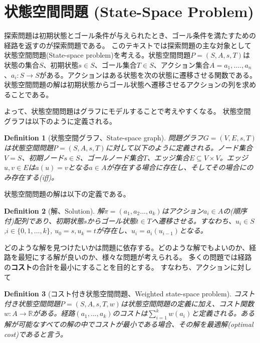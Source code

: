\documentclass{book}
\newtheorem{definition}{Definition}
\begin{document}
\section{状態空間問題 (State-Space Problem)}
\label{sec:state-space-problem}
探索問題は初期状態とゴール条件が与えられたとき、ゴール条件を満たすための経路を返すのが探索問題である。
このテキストでは探索問題の主な対象として状態空間問題(State-space problem)を考える。状態空間問題$P = (S, A, s, T)$は状態の集合$S$、初期状態$s \in S$、ゴール集合$T \in S$、アクション集合$A = {a_1, ....,a_n}$、$a_i : S \rightarrow S$がある。アクションはある状態を次の状態に遷移させる関数である。
状態空間問題の解は初期状態からゴール状態へ遷移させるアクションの列を求めることである。

よって、状態空間問題はグラフにモデルすることで考えやすくなる。
状態空間グラフは以下のように定義される。

\begin{definition}[状態空間グラフ、State-space graph]
問題グラフ$G = (V, E, s, T)$は状態空間問題$P = (S, A, s, T)$に対して以下のように定義される。ノード集合 $V = S$、初期ノード$s \in S$、ゴールノード集合$T$、エッジ集合$E\subseteq V \times V$。エッジ$u,v\in E$は$a(u) = v$となる$a\in A$が存在する場合に存在し、そしてその場合にのみ存在する(iff)。
\end{definition}

状態空間問題の解は以下の定義である。

\begin{definition}[解、Solution]
解$\pi = (a_1,a_2...,a_k)$はアクション$a_i \in A$の(順序付)配列であり、初期状態$s$からゴール状態$t \in T$へ遷移させる。すなわち、$u_i \in S$,$i \in \{0,1,...,k\}$, $u_0 = s, u_k = t$が存在し、$u_i = a_i(u_{i-1})$となる。
\end{definition}

どのような解を見つけたいかは問題に依存する。どのような解でもよいのか、経路を最短にする解が良いのか、様々な問題が考えられる。
多くの問題では経路の{\bf コスト}の合計を最小にすることを目的とする。
すなわち、アクションに対して

\begin{definition}[コスト付き状態空間問題、Weighted state-space problem]
コスト付き状態空間問題$P = (S, A, s, T, w)$は状態空間問題の定義に加え、コスト関数$w: A \rightarrow \mathbb{R}$がある。経路$(a_1,...,a_k)$のコストは$\sum^k_{i=1}w(a_i)$と定義される。ある解が可能なすべての解の中でコストが最小である場合、その解を最適解(optimal cost)であると言う。
\end{definition}
\end{document}
